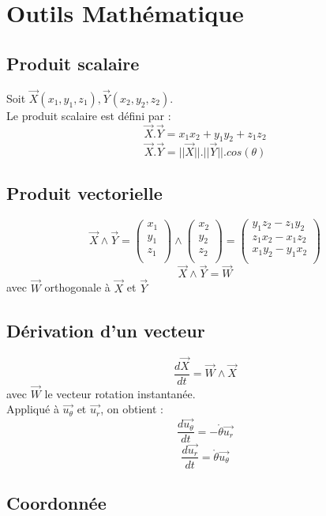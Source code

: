 \chapter{Outils Math\'ematique}
\section{Produit scalaire}
Soit $\overrightarrow{X}(x_1,y_1,z_1),\overrightarrow{Y}(x_2,y_2,z_2)$.\\
Le produit scalaire est défini par :
$$\overrightarrow{X}.\overrightarrow{Y}=x_1x_2+y_1y_2+z_1z_2$$
$$\overrightarrow{X}.\overrightarrow{Y}=||\overrightarrow{X}||.||\overrightarrow{Y}||.cos(\theta)$$
\section{Produit vectorielle}
$$\overrightarrow{X}\wedge\overrightarrow{Y} = \begin{pmatrix}
  x_1 \\
  y_1 \\
  z_1 \\
\end{pmatrix}\wedge\begin{pmatrix}
  x_2 \\
  y_2 \\
  z_2 \\
\end{pmatrix} = \begin{pmatrix}
  y_1z_2 - z_1y_2 \\
  z_1x_2 - x_1z_2 \\
  x_1y_2 - y_1x_2 \\
\end{pmatrix}$$
$$\overrightarrow{X}\wedge\overrightarrow{Y}=\overrightarrow{W}$$
avec $\overrightarrow{W}$ orthogonale à $\overrightarrow{X}$ et $\overrightarrow{Y}$
\section{Dérivation d'un vecteur}
$$\dfrac{d\overrightarrow{X}}{dt} = \overrightarrow{W}\wedge\overrightarrow{X}$$
avec $\overrightarrow{W}$ le vecteur rotation instantanée.\\
Appliqué à $\overrightarrow{u_{\theta}}$ et $\overrightarrow{u_{r}}$, on obtient :
$$\dfrac{d\overrightarrow{u_{\theta}}}{dt} = -\mathring{\theta}\overrightarrow{u_{r}}$$
$$\dfrac{d\overrightarrow{u_{r}}}{dt} = \mathring{\theta}\overrightarrow{u_{\theta}}$$
\section{Coordonnée}

